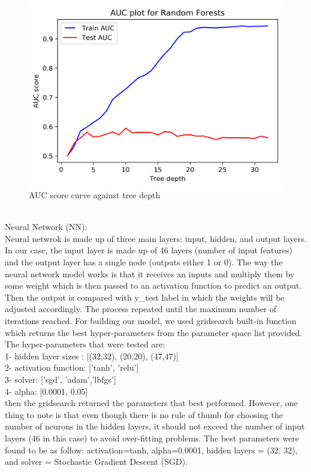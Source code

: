 \begin{figure}[!ht]
 \centering
\includegraphics[width=6.1in]{assignment2/1-3-RandomForests_AUC(TreeDepth).png}
\caption{\label{fig:fig3}AUC score curve against tree depth}
\end{figure}

\\

Neural Network (NN): \\
Neural netwrok is made up of three main layers: input, hidden, and output layers. In our case, the input layer is made up of 46 layers (number of input features) and the output layer has a single node (outputs either 1 or 0). The way the neural network model works is that it receives an inputs and multiply them by some weight which is then passed to an activation function to predict an output. Then the output is compared with y\_test label in which the weights will be adjusted accordingly. The process repeated until the maximum number of iterations reached. For building our model, we used gridsearch built-in function which returns the best hyper-parameters from the parameter space list provided. The hyper-parameters that were tested are:\\
1- hidden layer sizes : [(32,32), (20,20), (47,47)] \\
2- activation function: ['tanh', 'relu'] \\
3- solver: ['sgd', 'adam','lbfgs'] \\
4- alpha: [0.0001, 0.05] \\
then the gridsearch returned the parameters that best performed. However, one thing to note is that even though there is no rule of thumb for choosing the number of neurons in the hidden layers, it should not exceed the number of input layers (46 in this case) to avoid over-fitting problems. 
The best parameters were found to be as follow: activation=tanh, alpha=0.0001, hidden layers = (32, 32), and solver = Stochastic Gradient Descent (SGD). 

